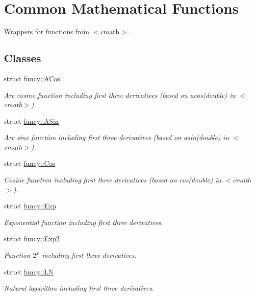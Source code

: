 \hypertarget{group__CMathGroup}{\section{Common Mathematical Functions}
\label{group__CMathGroup}
}


Wrappers for functions from $<$cmath$>$.  


\subsection*{Classes}
\begin{DoxyCompactItemize}
\item 
struct \hyperlink{structfuncy_1_1ACos}{funcy\-::\-A\-Cos}
\begin{DoxyCompactList}\small\item\em Arc cosine function including first three derivatives (based on acos(double) in $<$cmath$>$). \end{DoxyCompactList}\item 
struct \hyperlink{structfuncy_1_1ASin}{funcy\-::\-A\-Sin}
\begin{DoxyCompactList}\small\item\em Arc sine function including first three derivatives (based on asin(double) in $<$cmath$>$). \end{DoxyCompactList}\item 
struct \hyperlink{structfuncy_1_1Cos}{funcy\-::\-Cos}
\begin{DoxyCompactList}\small\item\em Cosine function including first three derivatives (based on cos(double) in $<$cmath$>$). \end{DoxyCompactList}\item 
struct \hyperlink{structfuncy_1_1Exp}{funcy\-::\-Exp}
\begin{DoxyCompactList}\small\item\em Exponential function including first three derivatives. \end{DoxyCompactList}\item 
struct \hyperlink{structfuncy_1_1Exp2}{funcy\-::\-Exp2}
\begin{DoxyCompactList}\small\item\em Function $2^x$ including first three derivatives. \end{DoxyCompactList}\item 
struct \hyperlink{structfuncy_1_1LN}{funcy\-::\-L\-N}
\begin{DoxyCompactList}\small\item\em Natural logarithm including first three derivatives. \end{DoxyCompactList}\item 

\end{DoxyCompactItemize}

